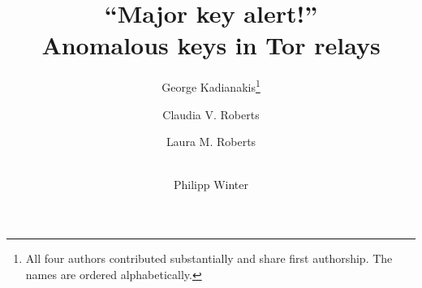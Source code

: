 \documentclass{llncs}
\begin{document}
\title{``Major key alert!''\\Anomalous keys in Tor relays}

\author{
	George Kadianakis\thanks{All four authors contributed substantially
	and share first authorship. The names are ordered alphabetically.} \and
	Claudia V. Roberts \and
	Laura M. Roberts \and \\
	Philipp Winter
}



\pagestyle{headings}  %

\maketitle




















{}


\end{document}
